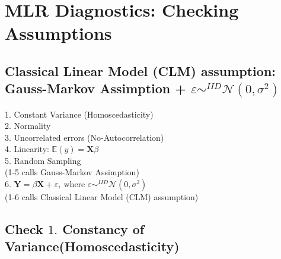 \documentclass[11pt,a4paper]{article}
\begin{document}
\section{ MLR Diagnostics: Checking Assumptions}
\subsection{Classical Linear Model (CLM) assumption: Gauss-Markov Assimption + $\varepsilon \sim^{IID} \mathcal{N}(0,\sigma^2)$}
1. Constant Variance (Homoscedasticity)\\
2. Normality\\
3. Uncorrelated errors (No-Autocorrelation)\\
4. Linearity: $\mathbb{E}(y)=\mathbf{X}\beta$\\
5. Random Sampling\\
(1-5 calls Gauss-Markov Assimption)\\
6. $\mathbf{Y}=\beta \mathbf{X}+\varepsilon,\ \text{where }\varepsilon\sim^{IID} \mathcal{N}(0,\sigma^2)$\\
(1-6 calls Classical Linear Model (CLM) assumption)

\subsection{Check $1.$ Constancy of Variance(Homoscedasticity)}
\end{document}
